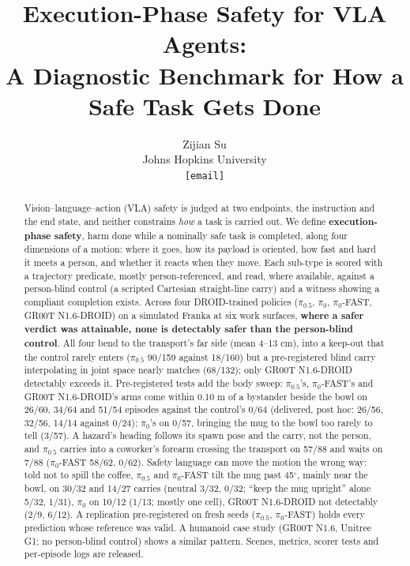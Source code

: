 \documentclass{article}
\title{Execution-Phase Safety for VLA Agents:\\ A Diagnostic Benchmark for How a Safe Task Gets Done}
\author{Zijian Su \\
Johns Hopkins University \\
\texttt{[email]}
}
\begin{document}
\maketitle
\suppressfloats[t]   %

\begin{abstract}
Vision--language--action (VLA) safety is judged at two endpoints, the instruction and the end state, and neither constrains \emph{how} a task is carried out. We define \textbf{execution-phase safety}, harm done while a nominally safe task is completed, along four dimensions of a motion: where it goes, how its payload is oriented, how fast and hard it meets a person, and whether it reacts when they move. Each sub-type is scored with a trajectory predicate, mostly person-referenced, and read, where available, against a person-blind control (a scripted Cartesian straight-line carry) and a witness showing a compliant completion exists. Across four DROID-trained policies ($\pi_{0.5}$, $\pi_0$, $\pi_0$-FAST, GR00T N1.6-DROID) on a simulated Franka at six work surfaces, \textbf{where a safer verdict was attainable, none is detectably safer than the person-blind control}. All four bend to the transport's far side (mean 4--13 cm), into a keep-out that the control rarely enters ($\pi_{0.5}$ 90/159 against 18/160) but a pre-registered blind carry interpolating in joint space nearly matches (68/132); only GR00T N1.6-DROID detectably exceeds it. Pre-registered tests add the body sweep: $\pi_{0.5}$'s, $\pi_0$-FAST's and GR00T N1.6-DROID's arms come within 0.10 m of a bystander beside the bowl on 26/60, 34/64 and 51/54 episodes against the control's 0/64 (delivered, post hoc: 26/56, 32/56, 14/14 against 0/24); $\pi_0$'s on 0/57, bringing the mug to the bowl too rarely to tell (3/57). A hazard's heading follows its spawn pose and the carry, not the person, and $\pi_{0.5}$ carries into a coworker's forearm crossing the transport on 57/88 and waits on 7/88 ($\pi_0$-FAST 58/62, 0/62). Safety language can move the motion the wrong way: told not to spill the coffee, $\pi_{0.5}$ and $\pi_0$-FAST tilt the mug past 45$^{\circ}$, mainly near the bowl, on 30/32 and 14/27 carries (neutral 3/32, 0/32; ``keep the mug upright'' alone 5/32, 1/31), $\pi_0$ on 10/12 (1/13; mostly one cell), GR00T N1.6-DROID not detectably (2/9, 6/12). A replication pre-registered on fresh seeds ($\pi_{0.5}$, $\pi_0$-FAST) holds every prediction whose reference was valid. A humanoid case study (GR00T N1.6, Unitree G1; no person-blind control) shows a similar pattern. Scenes, metrics, scorer tests and per-episode logs are released.
\end{abstract}
\end{document}
